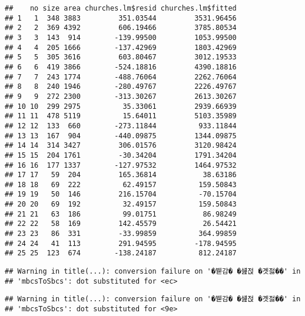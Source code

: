 \documentclass[
]{article}
\newenvironment{Shaded}{\begin{snugshade}}{\end{snugshade}}
\newcommand{\AttributeTok}[1]{\textcolor[rgb]{0.77,0.63,0.00}{#1}}
\newcommand{\CommentTok}[1]{\textcolor[rgb]{0.56,0.35,0.01}{\textit{#1}}}
\newcommand{\DecValTok}[1]{\textcolor[rgb]{0.00,0.00,0.81}{#1}}
\newcommand{\FunctionTok}[1]{\textcolor[rgb]{0.00,0.00,0.00}{#1}}
\newcommand{\NormalTok}[1]{#1}
\newcommand{\SpecialCharTok}[1]{\textcolor[rgb]{0.00,0.00,0.00}{#1}}
\newcommand{\StringTok}[1]{\textcolor[rgb]{0.31,0.60,0.02}{#1}}
\begin{document}
\begin{verbatim}
##    no size area churches.lm$resid churches.lm$fitted
## 1   1  348 3883         351.03544         3531.96456
## 2   2  369 4392         606.19466         3785.80534
## 3   3  143  914        -139.99500         1053.99500
## 4   4  205 1666        -137.42969         1803.42969
## 5   5  305 3616         603.80467         3012.19533
## 6   6  419 3866        -524.18816         4390.18816
## 7   7  243 1774        -488.76064         2262.76064
## 8   8  240 1946        -280.49767         2226.49767
## 9   9  272 2300        -313.30267         2613.30267
## 10 10  299 2975          35.33061         2939.66939
## 11 11  478 5119          15.64011         5103.35989
## 12 12  133  660        -273.11844          933.11844
## 13 13  167  904        -440.09875         1344.09875
## 14 14  314 3427         306.01576         3120.98424
## 15 15  204 1761         -30.34204         1791.34204
## 16 16  177 1337        -127.97532         1464.97532
## 17 17   59  204         165.36814           38.63186
## 18 18   69  222          62.49157          159.50843
## 19 19   50  146         216.15704          -70.15704
## 20 20   69  192          32.49157          159.50843
## 21 21   63  186          99.01751           86.98249
## 22 22   58  169         142.45579           26.54421
## 23 23   86  331         -33.99859          364.99859
## 24 24   41  113         291.94595         -178.94595
## 25 25  123  674        -138.24187          812.24187
\end{verbatim}

\begin{Shaded}
\end{Shaded}

\begin{verbatim}
## Warning in title(...): conversion failure on '�붿감� �섎젅 �곗젏��' in
## 'mbcsToSbcs': dot substituted for <ec>
\end{verbatim}

\begin{verbatim}
## Warning in title(...): conversion failure on '�붿감� �섎젅 �곗젏��' in
## 'mbcsToSbcs': dot substituted for <9e>
\end{verbatim}
\end{document}
